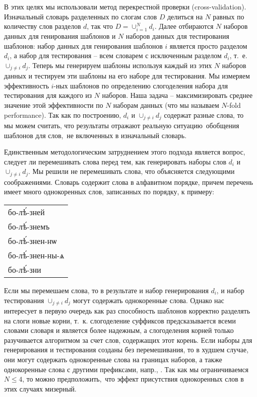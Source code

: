 \documentclass[12pt,a4paper,oneside]{extarticle}
\begin{document}
В этих целях мы использовали метод перекрестной проверки (\textenglish{cross-validation}). Изначальный словарь разделенных по слогам слов $D$ делиться на $N$ равных по количеству слов разделов $d$, так что $D = \cup_{i = 1}^{N} d_i$. Далее отбираются $N$ наборов данных для генирования шаблонов и $N$ наборов данных для тестирования шаблонов: набор данных для генирования шаблонов $i$ является просто разделом $d_i$, а набор для тестирования -- всем словарем с исключенным разделом $d_i$, т.~е. $\cup_{j \neq i} d_j$. Теперь мы генерируем шаблоны используя каждый из этих $N$ наборов данных и тестируем эти шаблоны на его наборе для тестирования. Мы измеряем эффективность  $i$-ных шаблонов по определению слогоделения набора для тестирования для каждого из $N$ наборов. Наша задача -- максимизировать среднее значение этой эффективности по $N$ наборам данных (что мы называем \textenglish{$N$-fold performance}). Так как по построению, $d_i$ и $\cup_{j \neq i} d_j$ содержат разные слова, то мы можем считать, что результаты отражают реальную ситуацию обобщения шаблонов для слов, не включенных в изначальный словарь.

Единственным методологическим затруднением этого подхода является вопрос, следует ли перемешивать слова перед тем, как генерировать наборы слов $d_i$ и $\cup_{j \neq i} d_j$. Мы решили не перемешивать слова, что объясняется следующими соображениями. Словарь содержит слова в алфавитном порядке, причем перечень имеет много однокоренных слов, записанных по порядку, к примеру:

\begin{center}
\begin{churchslavonic}
\begin{tabular}{l}
бо-лѣ́-зней \\
бо-лѣ́-знемъ \\
бо-лѣ́-знен-нѡ \\
бо-лѣ́-знен-ны-ѧ \\
бо-лѣ́-зни \\
\end{tabular}
\end{churchslavonic}
\end{center}

\noindent Если мы перемешаем слова, то в результате и набор генерирования $d_i$, и набор тестирования $\cup_{j \neq i} d_j$ могут содержать однокоренные слова. Однако нас интересует в первую очередь как раз способность шаблонов корректно разделять на слоги новые корни, т.~к. слогоделение суффиксов предсказывается всеми словами словаря и является более надежным, а слогоделения корней только разучивается алгоритмом за счет слов, содержащих этот корень. Если наборы для генерирования и тестирования созданы без перемешивания, то в худшем случае, они могут содержать однокоренные слова на границах наборов, а также однокоренные слова с другими префиксами, напр., . Так как мы ограничиваемся $N \leq 4$, то можно предположить, что эффект присутствия однокоренных слов в этих случаях мизерный.
\end{document}
